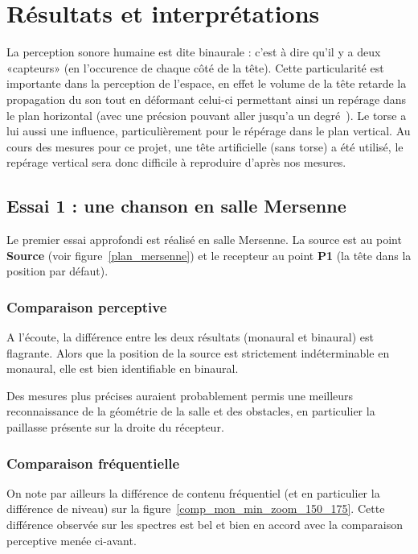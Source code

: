 \chapter{Résultats et interprétations}

La perception sonore humaine est dite binaurale : c'est à dire qu'il y a deux «capteurs» (en l'occurence de chaque côté
de la tête).
Cette particularité est importante dans la perception de l'espace, en effet le volume de la tête retarde la propagation
du son tout en déformant celui-ci permettant ainsi un repérage dans le plan horizontal (avec une précsion pouvant aller
jusqu'a un degré~\cite{Vor08}). Le torse a lui aussi une influence, particulièrement pour le répérage dans le plan
vertical. Au cours des mesures pour ce projet, une tête artificielle (sans torse) a été utilisé, le repérage vertical
sera donc difficile à reproduire d'après nos mesures.

\section{Essai 1 : une chanson en salle Mersenne} %

Le premier essai approfondi est réalisé en salle Mersenne. La source est au point \textbf{Source} (voir
figure~\ref{plan_mersenne}) et le recepteur au point \textbf{P1} (la tête dans la position par défaut).

\subsection{Comparaison perceptive} %

A l'écoute, la différence entre les deux résultats (monaural et binaural) est flagrante. Alors que la position de la
source est strictement indéterminable en monaural, elle est bien identifiable en binaural.

Des mesures plus précises auraient probablement permis une meilleurs reconnaissance de la géométrie de la salle et des
obstacles, en particulier la paillasse présente sur la droite du récepteur.

\subsection{Comparaison fréquentielle} %

On note par ailleurs la différence de contenu fréquentiel (et en particulier la différence de niveau) sur la
figure~\ref{comp_mon_min_zoom_150_175}. Cette différence observée sur les spectres est bel et bien en accord avec la
comparaison perceptive menée ci-avant.


